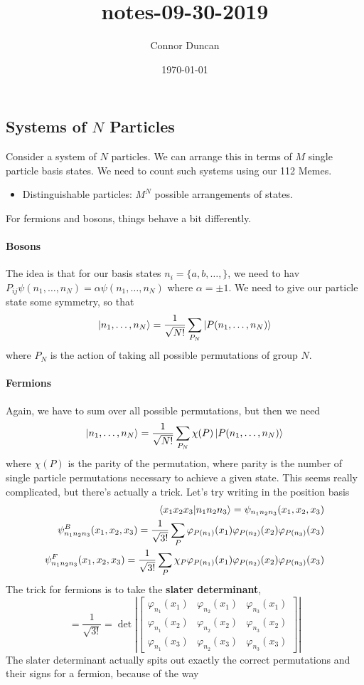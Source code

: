 \documentclass{article}
\author{Connor Duncan}
\date{\today}
\title{notes-09-30-2019}
\theoremstyle{definition}
\begin{document}
\subsection{Systems of $N$ Particles} Consider a system of $N$ particles. We can arrange this in terms of $M$ single particle basis states. We need to count such systems using our 112 Memes. \begin{itemize} \item Distinguishable particles: $M^N$ possible arrangements of states. \end{itemize} For fermions and bosons, things behave a bit differently. \paragraph{Bosons} The idea is that for our basis states $n_i=\{a,b,\dots,\}$, we need to hav $P_{ij}\psi(n_1,\dots,n_N)=\alpha\psi(n_1,\dots,n_N)$ where $\alpha=\pm1$. We need to give our particle state some symmetry, so that \begin{equation} \ket{n_1,\dots,n_N}=\frac{1}{\sqrt{N!}}\sum_{P_N}\ket{P(n_1,\dots,n_N)} \end{equation} where $P_N$ is the action of taking all possible permutations of group $N$. \paragraph{Fermions} Again, we have to sum over all possible permutations, but then we need \begin{equation} \ket{n_1,\dots,n_N}=\frac{1}{\sqrt{N!}}\sum_{P_N}\chi(P)\ket{P(n_1,\dots,n_N)} \end{equation} where $\chi(P)$ is the parity of the permutation, where parity is the number of single particle permutations necessary to achieve a given state. This seems really complicated, but there's actually a trick. Let's try writing in the position basis \begin{align} \bra{x_1x_2x_3}\ket{n_1n_2n_3}=\psi_{n_1n_2n_3}(x_1,x_2,x_3)\\ \psi_{n_1n_2n_3}^{B}(x_1,x_2,x_3)=\frac{1}{\sqrt{3!}}\sum_P\varphi_{P(n_1)}(x_1)\varphi_{P(n_2)}(x_2)\varphi_{P(n_3)}(x_3)\\ \psi_{n_1n_2n_3}^{F}(x_1,x_2,x_3)=\frac{1}{\sqrt{3!}}\sum_P\chi_P\varphi_{P(n_1)}(x_1)\varphi_{P(n_2)}(x_2)\varphi_{P(n_3)}(x_3) \end{align} The trick for fermions is to take the \textbf{slater determinant}, \begin{equation} =\frac{1}{\sqrt{3!}}=\det\left| \begin{bmatrix} \varphi_{n_1}(x_1) & \varphi_{n_2}(x_1) & \varphi_{n_3}(x_1) \\ \varphi_{n_1}(x_2) & \varphi_{n_2}(x_2) & \varphi_{n_3}(x_2) \\ \varphi_{n_1}(x_3) & \varphi_{n_2}(x_3) & \varphi_{n_3}(x_3) \end{bmatrix} \right| \end{equation} The slater determinant actually spits out exactly the correct permutations and their signs for a fermion, because of the way 
\end{document}

